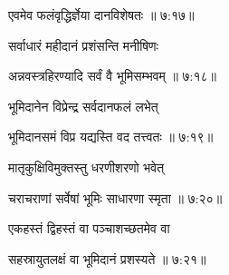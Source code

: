 
{\devanagarifont एवमेव फलंवृद्धिर्ज्ञेया दानविशेषतः {॥ ७:१७॥} \veg\dontdisplaylinenum }%



{\devanagarifont सर्वाधारं महीदानं प्रशंसन्ति मनीषिणः \thinspace{\dandab} \dontdisplaylinenum }%


{\devanagarifont अन्नवस्त्रहिरण्यादि सर्वं वै भूमिसम्भवम् {॥ ७:१८॥} \veg\dontdisplaylinenum }%

{\devanagarifont भूमिदानेन विप्रेन्द्र सर्वदानफलं लभेत् \thinspace{\dandab} \dontdisplaylinenum }%


{\devanagarifont भूमिदानसमं विप्र यद्यस्ति वद तत्त्वतः {॥ ७:१९॥} \veg\dontdisplaylinenum }%
 
{\devanagarifont मातृकुक्षिविमुक्तस्तु धरणीशरणो भवेत् \thinspace{\dandab} \dontdisplaylinenum }%


{\devanagarifont चराचराणां सर्वेषां भूमिः साधारणा स्मृता {॥ ७:२०॥} \veg\dontdisplaylinenum }%
 
{\devanagarifont एकहस्तं द्विहस्तं वा पञ्चाशच्छतमेव वा \thinspace{\dandab} \dontdisplaylinenum }%


{\devanagarifont सहस्रायुतलक्षं वा भूमिदानं प्रशस्यते {॥ ७:२१॥} \veg\dontdisplaylinenum }%

